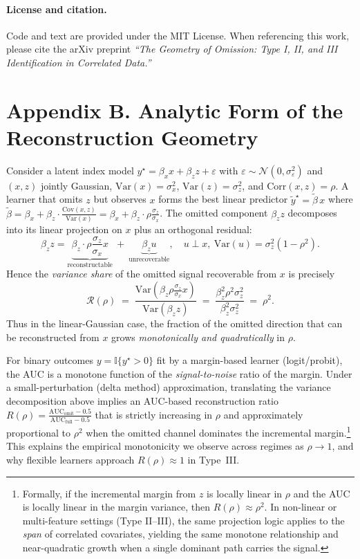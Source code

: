 \documentclass[11pt]{article}
\begin{document}
\paragraph{License and citation.}
Code and text are provided under the MIT License.
When referencing this work, please cite the arXiv preprint
\emph{“The Geometry of Omission: Type I, II, and III Identification in Correlated Data.”}


\section*{Appendix B. Analytic Form of the Reconstruction Geometry}
\label{app:simple-geometry}

Consider a latent index model $y^\star = \beta_x x + \beta_z z + \varepsilon$ with
$\varepsilon \sim \mathcal{N}(0,\sigma_\varepsilon^2)$ and $(x,z)$ jointly Gaussian,
$\mathrm{Var}(x)=\sigma_x^2$, $\mathrm{Var}(z)=\sigma_z^2$, and $\mathrm{Corr}(x,z)=\rho$.
A learner that omits $z$ but observes $x$ forms the best linear predictor
$ \tilde y^\star = \tilde\beta\, x$ where
$\tilde\beta = \beta_x + \beta_z\cdot \frac{\mathrm{Cov}(x,z)}{\mathrm{Var}(x)}
= \beta_x + \beta_z\cdot \rho \frac{\sigma_z}{\sigma_x}$.
The omitted component $\beta_z z$ decomposes into its linear projection on $x$
plus an orthogonal residual:
\[
\beta_z z = \underbrace{\beta_z \cdot \rho \frac{\sigma_z}{\sigma_x} x}_{\text{reconstructable}} ~+~ \underbrace{\beta_z u}_{\text{unrecoverable}},
\quad u \perp x,\ \mathrm{Var}(u) = \sigma_z^2(1-\rho^2).
\]
Hence the \emph{variance share} of the omitted signal recoverable from $x$ is precisely
\[
\mathcal{R}(\rho) \;=\; \frac{\mathrm{Var}\!\left(\beta_z \rho \tfrac{\sigma_z}{\sigma_x} x\right)}
{\mathrm{Var}(\beta_z z)}
\;=\; \frac{\beta_z^2 \rho^2 \sigma_z^2}{\beta_z^2 \sigma_z^2}
\;=\; \rho^2.
\]
Thus in the linear-Gaussian case, the fraction of the omitted direction that can be
reconstructed from $x$ grows \emph{monotonically and quadratically} in $\rho$.

For binary outcomes $y=\mathbb{I}\{y^\star>0\}$ fit by a margin-based learner (logit/probit),
the AUC is a monotone function of the \emph{signal-to-noise} ratio of the margin.
Under a small-perturbation (delta method) approximation, translating the variance
decomposition above implies an AUC-based reconstruction ratio
$R(\rho) = \frac{\mathrm{AUC}_{\text{omit}}-0.5}{\mathrm{AUC}_{\text{full}}-0.5}$
that is strictly increasing in $\rho$ and approximately proportional to $\rho^2$
when the omitted channel dominates the incremental margin.\footnote{
Formally, if the incremental margin from $z$ is locally linear in $\rho$ and
the AUC is locally linear in the margin variance, then $R(\rho)\approx \rho^2$.
In non-linear or multi-feature settings (Type II–III), the same projection logic
applies to the \emph{span} of correlated covariates, yielding the same monotone
relationship and near-quadratic growth when a single dominant path carries the signal.}
This explains the empirical monotonicity we observe across regimes as $\rho\to 1$,
and why flexible learners approach $R(\rho)\approx 1$ in Type~III.
\end{document}
